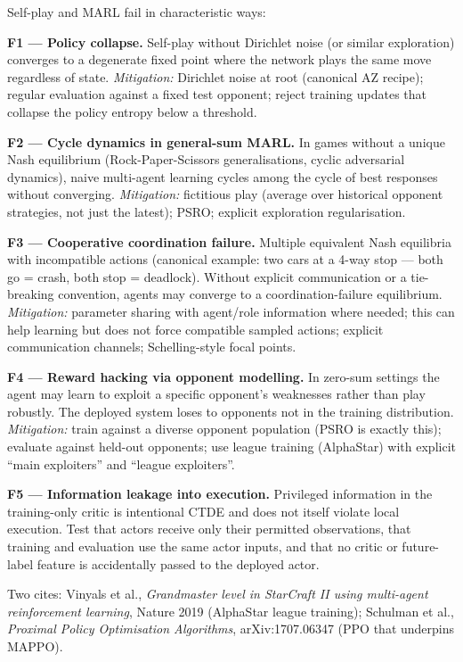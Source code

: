 \documentclass[11pt,oneside]{scrbook}
\begin{document}
\begin{safetyangle}
Self-play and MARL fail in characteristic ways:

\textbf{F1 --- Policy collapse.} Self-play without Dirichlet noise (or
similar exploration) converges to a degenerate fixed point where the
network plays the same move regardless of state. \emph{Mitigation:}
Dirichlet noise at root (canonical AZ recipe); regular evaluation against
a fixed test opponent; reject training updates that collapse the policy
entropy below a threshold.

\textbf{F2 --- Cycle dynamics in general-sum MARL.} In games without a
unique Nash equilibrium (Rock-Paper-Scissors generalisations, cyclic
adversarial dynamics), naive multi-agent learning cycles among the cycle
of best responses without converging. \emph{Mitigation:} fictitious play
(average over historical opponent strategies, not just the latest);
PSRO; explicit exploration regularisation.

\textbf{F3 --- Cooperative coordination failure.} Multiple equivalent
Nash equilibria with incompatible actions (canonical example: two cars
at a 4-way stop --- both go = crash, both stop = deadlock). Without
explicit communication or a tie-breaking convention, agents may converge
to a coordination-failure equilibrium. \emph{Mitigation:} parameter sharing with agent/role information where needed; this
can help learning but does not force compatible sampled actions; explicit communication channels;
Schelling-style focal points.

\textbf{F4 --- Reward hacking via opponent modelling.} In zero-sum
settings the agent may learn to exploit a specific opponent's
weaknesses rather than play robustly. The deployed system loses to
opponents not in the training distribution. \emph{Mitigation:} train
against a diverse opponent population (PSRO is exactly this); evaluate
against held-out opponents; use league training (AlphaStar) with
explicit ``main exploiters'' and ``league exploiters''.

\textbf{F5 --- Information leakage into execution.} Privileged information
in the training-only critic is intentional CTDE and does not itself violate
local execution. Test that actors receive only their permitted observations,
that training and evaluation use the same actor inputs, and that no critic
or future-label feature is accidentally passed to the deployed actor.



Two cites: Vinyals et al., \emph{Grandmaster level in StarCraft II using
multi-agent reinforcement learning}, Nature 2019 (AlphaStar league
training); Schulman et al., \emph{Proximal Policy Optimisation Algorithms},
arXiv:1707.06347 (PPO that underpins MAPPO).
\end{safetyangle}
\end{document}

